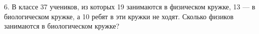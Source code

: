 6. В классе 37 учеников, из которых 19 занимаются в физическом кружке, 13 --- в биологическом кружке, а 10 ребят в эти кружки не ходят. Сколько физиков занимаются в биологическом кружке?\\
